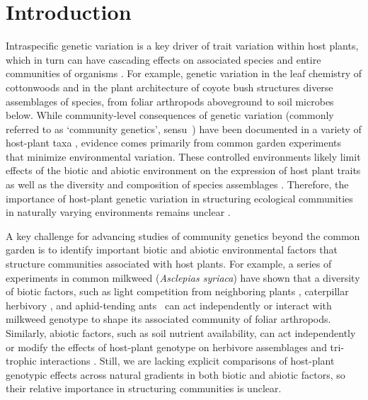 \documentclass[11pt]{article}
\begin{document}
\newpage{}

\section*{Introduction}


Intraspecific genetic variation is a key driver of trait variation
within host plants, which in turn can have cascading effects on
associated species and entire communities of organisms
\cite{Fritz_1988}\cite{Lamit_2016}\cite{Maddox_1990}\cite{antonovics1992toward}. For
example, genetic variation in the leaf chemistry of cottonwoods
\cite{Whitham_2006} and in the plant architecture of coyote bush
\cite{Crutsinger_2014} structures diverse assemblages of species, from foliar
arthropods aboveground to soil microbes below. While community-level
consequences of genetic variation (commonly referred to as `community
genetics', sensu~\cite{antonovics1992toward}) have been documented in a variety of
host-plant taxa \cite{Whitham_2012}, evidence comes primarily from common
garden experiments that minimize environmental variation. These
controlled environments likely limit effects of the biotic and abiotic
environment on the expression of host plant traits \cite{Gratani_2014} as
well as the diversity and composition of species assemblages
\cite{macarthur1972geographical}\cite{Gaston_2000}. Therefore, the importance of
host-plant genetic variation in structuring ecological communities in
naturally varying environments remains unclear
\cite{Hersch_Green_2011}\cite{Tack_2011}\cite{Crutsinger_2015}.

A key challenge for advancing studies of community genetics beyond the
common garden is to identify important biotic and abiotic environmental
factors that structure communities associated with host plants. For
example, a series of experiments in common milkweed (\emph{Asclepias
syriaca}) have shown that a diversity of biotic factors, such as light
competition from neighboring plants \cite{Agrawal_2003}, caterpillar
herbivory \cite{Abdala_Roberts_2012}, and aphid-tending
ants~\cite{Mooney_2008}\cite{Abdala_Roberts_2012} can act independently or interact
with milkweed genotype to shape its associated community of foliar
arthropods. Similarly, abiotic factors, such as soil nutrient
availability, can act independently or modify the effects of host-plant
genotype on herbivore assemblages \cite{Orians_1996} and tri-trophic
interactions \cite{Rossi_1998}\cite{Abdala_Roberts_2012a}. Still, we are lacking
explicit comparisons of host-plant genotypic effects across natural
gradients in both biotic and abiotic factors, so their relative
importance in structuring communities is unclear.
\end{document}
